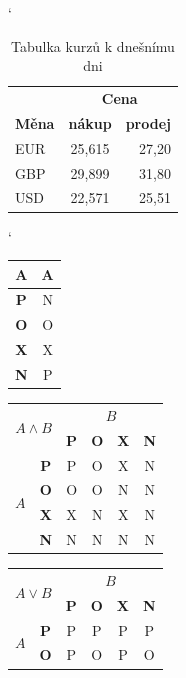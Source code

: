 \documentclass[11pt, a4paper]{article}
\begin{document}
\begin{table}[h]
\catcode`
\begin{center}
\begin{tabular}{|l|c|r|} \hline
      & \multicolumn{2}{c|}{\textbf{Cena}} \\ \cline{2-3}
     \textbf{Měna} & \textbf{nákup} & \textbf{prodej} \\ \hline
     EUR & 25,615 & 27,20 \\
     GBP & 29,899 & 31,80 \\
     USD & 22,571 & 25,51 \\ \hline
\end{tabular}
\caption{Tabulka kurzů k dnešnímu dni}
\label{tab:Kurzy}   
\end{center}
\end{table} 
\begin{table}[h]
\catcode`
\begin{tabular}{|c|c|} \hline
     A & A \\ \hline
     \textbf{P} & N \\ \hline
     \textbf{O} & O \\ \hline
     \textbf{X} & X \\ \hline
     \textbf{N} & P \\ \hline
\end{tabular}
\begin{tabular}{|c|c|c|c|c|c|} \hline
     \multicolumn{2}{|c|}{\multirow{2}{*}{$A \land B$}} & \multicolumn{4}{c|}{$B$} \\ \cline{3-6}
     \multicolumn{2}{|c|}{} & \textbf{P} & \textbf{O} & \textbf{X} & \textbf{N} \\ \hline
     \multirow{4}{*}{$A$} & \textbf{P} & P & O & X & N \\ \cline{2-6}
     & \textbf{O} & O & O & N & N \\ \cline{2-6}
     & \textbf{X} & X & N & X & N \\ \cline{2-6}
     & \textbf{N} & N & N & N & N \\ \hline
\end{tabular}
\begin{tabular}{|c|c|c|c|c|c|} \hline
     \multicolumn{2}{|c|}{\multirow{2}{*}{$A \vee B$}} & \multicolumn{4}{c|}{$B$} \\ \cline{3-6}
     \multicolumn{2}{|c|}{} & \textbf{P} & \textbf{O} & \textbf{X} & \textbf{N} \\ \hline
     \multirow{4}{*}{$A$} & \textbf{P} & P & P & P & P \\ \cline{2-6}
     & \textbf{O} & P & O & P & O \\ \cline{2-6}

\end{tabular}
\end{table}
\end{document}
